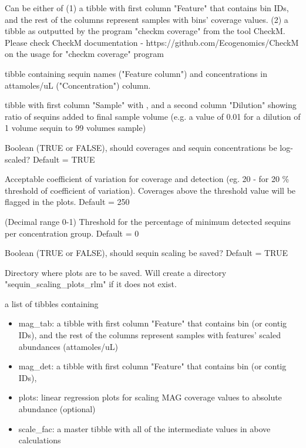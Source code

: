 \documentclass[a4paper]{book}
\begin{document}
\begin{Arguments}
\begin{ldescription}
\item[\code{f\_tibble}] Can be either of
(1) a tibble with first column "Feature" that contains bin IDs, and the rest of the columns represent samples with bins' coverage values.
(2) a tibble as outputted by the program "checkm coverage" from the tool CheckM. Please check CheckM documentation - https://github.com/Ecogenomics/CheckM on the usage for "checkm coverage" program

\item[\code{sequin\_meta}] tibble containing sequin names ("Feature column") and concentrations in attamoles/uL ("Concentration") column.

\item[\code{seq\_dilution}] tibble with first column "Sample" with , and a second column "Dilution" showing ratio of sequins added to final sample volume (e.g. a value of 0.01 for a dilution of 1 volume sequin to 99 volumes sample)

\item[\code{log\_trans}] Boolean (TRUE or FALSE), should coverages and sequin concentrations be log-scaled? Default = TRUE

\item[\code{coe\_of\_variation}] Acceptable coefficient of variation for coverage and detection (eg. 20 - for 20 \% threshold of coefficient of variation). Coverages above the threshold value will be flagged in the plots. Default = 250

\item[\code{lod\_limit}] (Decimal range 0-1) Threshold for the percentage of minimum detected sequins per concentration group. Default = 0

\item[\code{save\_plots}] Boolean (TRUE or FALSE), should sequin scaling be saved? Default = TRUE

\item[\code{plot\_dir}] Directory where plots are to be saved. Will create a directory "sequin\_scaling\_plots\_rlm" if it does not exist.
\end{ldescription}
\end{Arguments}
%
\begin{Value}
a list of tibbles containing
\begin{itemize}

\item{} mag\_tab: a tibble with first column "Feature" that contains bin (or contig IDs), and the rest of the columns represent samples with features' scaled abundances (attamoles/uL)
\item{} mag\_det: a tibble with first column "Feature" that contains bin (or contig IDs),
\item{} plots: linear regression plots for scaling MAG coverage values to absolute abundance (optional)
\item{} scale\_fac: a master tibble with all of the intermediate values in above calculations

\end{itemize}

\end{Value}
\end{document}
